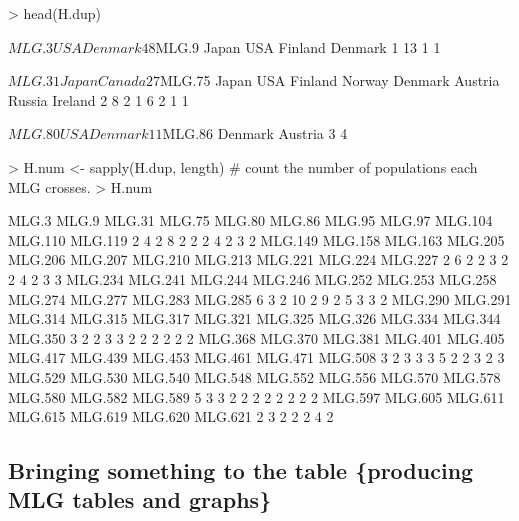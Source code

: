 \documentclass[letterpaper]{article}
\begin{document}
\begin{Schunk}
\begin{Sinput}
> head(H.dup)
\end{Sinput}
\begin{Soutput}
$MLG.3
    USA Denmark 
      4       8 

$MLG.9
  Japan     USA Finland Denmark 
      1      13       1       1 

$MLG.31
 Japan Canada 
     2      7 

$MLG.75
  Japan     USA Finland  Norway Denmark Austria  Russia Ireland 
      2       8       2       1       6       2       1       1 

$MLG.80
    USA Denmark 
      1       1 

$MLG.86
Denmark Austria 
      3       4 
\end{Soutput}
\begin{Sinput}
> H.num <- sapply(H.dup, length) # count the number of populations each MLG crosses.
> H.num
\end{Sinput}
\begin{Soutput}
  MLG.3   MLG.9  MLG.31  MLG.75  MLG.80  MLG.86  MLG.95  MLG.97 MLG.104 MLG.110 MLG.119 
      2       4       2       8       2       2       2       4       2       3       2 
MLG.149 MLG.158 MLG.163 MLG.205 MLG.206 MLG.207 MLG.210 MLG.213 MLG.221 MLG.224 MLG.227 
      2       6       2       2       3       2       2       4       2       3       3 
MLG.234 MLG.241 MLG.244 MLG.246 MLG.252 MLG.253 MLG.258 MLG.274 MLG.277 MLG.283 MLG.285 
      6       3       2      10       2       9       2       5       3       3       2 
MLG.290 MLG.291 MLG.314 MLG.315 MLG.317 MLG.321 MLG.325 MLG.326 MLG.334 MLG.344 MLG.350 
      3       2       2       3       3       2       2       2       2       2       2 
MLG.368 MLG.370 MLG.381 MLG.401 MLG.405 MLG.417 MLG.439 MLG.453 MLG.461 MLG.471 MLG.508 
      3       2       3       3       3       5       2       2       3       2       3 
MLG.529 MLG.530 MLG.540 MLG.548 MLG.552 MLG.556 MLG.570 MLG.578 MLG.580 MLG.582 MLG.589 
      5       3       3       2       2       2       2       2       2       2       2 
MLG.597 MLG.605 MLG.611 MLG.615 MLG.619 MLG.620 MLG.621 
      2       3       2       2       2       4       2 
\end{Soutput}
\end{Schunk}
\subsection{Bringing something to the table \{producing MLG tables and graphs\}}
\end{document}
